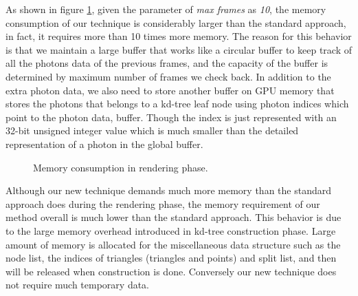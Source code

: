 As shown in figure \ref{fig:memory_consumption}, given the parameter of \emph{max frames} as \emph{10}, the memory consumption of our technique is considerably larger than the standard approach, in fact, it requires more than 10 times more memory. The reason for this behavior is that we maintain a large buffer that works like a circular buffer to keep track of all the photons data of the previous frames, and the capacity of the buffer is determined by maximum number of frames we check back. In addition to the extra photon data, we also need to store another buffer on GPU memory that stores the photons that belongs to a kd-tree leaf node using photon indices which point to the photon data, buffer. Though the index is just represented with an 32-bit unsigned integer value which is much smaller than the detailed representation of a photon in the global buffer.

\begin{figure}[ftp]
    \centering
    \renewcommand{\thefigure}{\thechapter.\arabic{figure}}
    \caption[Memory consumption in rendering phase]{Memory consumption in rendering phase.}
    \label{fig:memory_consumption}
\end{figure}

Although our new technique demands much more memory than the standard approach does during the rendering phase, the memory requirement of our method overall is much lower than the standard approach. This behavior is due to the large memory overhead introduced in kd-tree construction phase. Large amount of memory is allocated for the miscellaneous data structure such as the node list, the indices of triangles (triangles and points) and split list, and then will be released when construction is done. Conversely our new technique does not require much temporary data.


